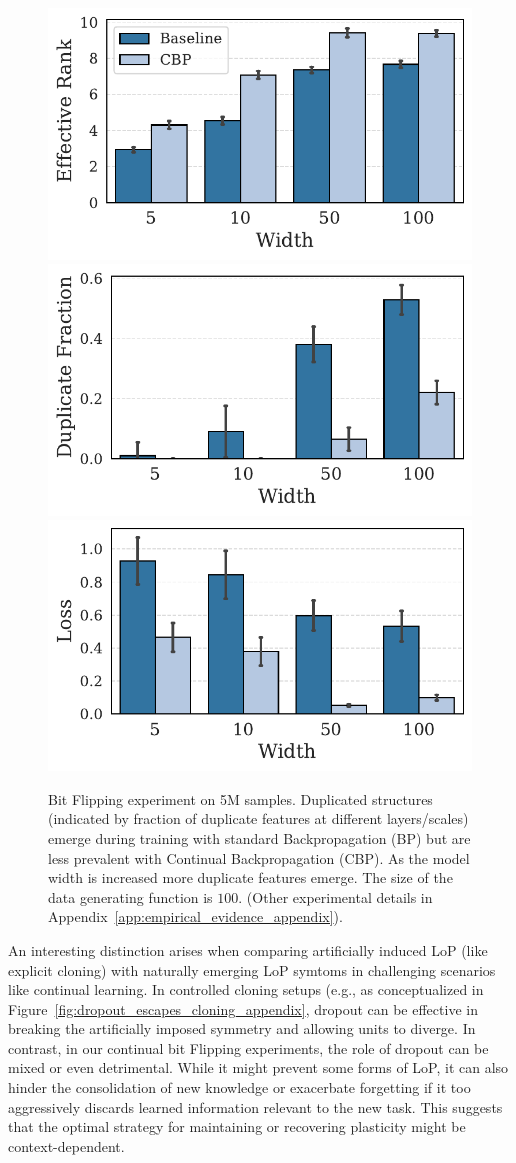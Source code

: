 \documentclass{article}
\numberwithin{figure}{section}
\begin{document}
\begin{figure}[!ht]
    \centering
    \includegraphics[width=0.23\linewidth]{paper/images/bf_Effective Rank_CBP_barplot.pdf}
    \includegraphics[width=0.23\linewidth]{paper/images/bf_Duplicate Fraction_CBP_barplot.pdf}
    \includegraphics[width=0.23\linewidth]{paper/images/bf_Loss_CBP_barplot.pdf}
    \vspace{-.3cm}
    \caption{Bit Flipping experiment on 5M samples. Duplicated structures (indicated by fraction of duplicate features at different layers/scales) emerge during training with standard Backpropagation (BP) but are less prevalent with Continual Backpropagation (CBP). As the model width is increased more duplicate features emerge. The size of the data generating function is $100$. (Other experimental details in Appendix~\ref{app:empirical_evidence_appendix}).}
    \label{fig:CBP-scale-dup}
\end{figure}

An interesting distinction arises when comparing artificially induced LoP (like explicit cloning) with naturally emerging LoP symtoms in challenging scenarios like continual learning. In controlled cloning setups (e.g., as conceptualized in Figure~\ref{fig:dropout_escapes_cloning_appendix}, dropout can be effective in breaking the artificially imposed symmetry and allowing units to diverge. In contrast, in our continual bit Flipping experiments, the role of dropout can be mixed or even detrimental. While it might prevent some forms of LoP, it can also hinder the consolidation of new knowledge or exacerbate forgetting if it too aggressively discards learned information relevant to the new task. This suggests that the optimal strategy for maintaining or recovering plasticity might be context-dependent.
\end{document}
